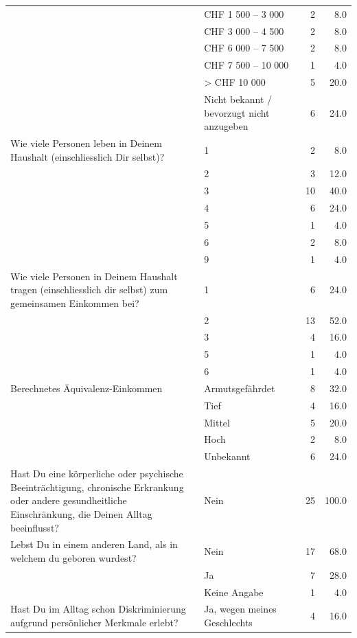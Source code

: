 \begin{appendices}
\begin{longtable}{p{5.5cm}p{5.5cm}rr}
     & CHF 1 500 – 3 000 & 2 & 8.0 \\*
     & CHF 3 000 – 4 500 & 2 & 8.0 \\*
     & CHF 6 000 – 7 500 & 2 & 8.0 \\*
     & CHF 7 500 – 10 000 & 1 & 4.0 \\*
     & > CHF 10 000 & 5 & 20.0 \\*
     & Nicht bekannt / bevorzugt nicht anzugeben & 6 & 24.0 \\
    \midrule
    \addlinespace
    Wie viele Personen leben in Deinem Haushalt (einschliesslich Dir selbst)? & 1 & 2 & 8.0 \\*
     & 2 & 3 & 12.0 \\*
     & 3 & 10 & 40.0 \\*
     & 4 & 6 & 24.0 \\*
     & 5 & 1 & 4.0 \\*
     & 6 & 2 & 8.0 \\*
     & 9 & 1 & 4.0 \\
    \midrule
    \addlinespace
    Wie viele Personen in Deinem Haushalt tragen (einschliesslich dir selbst) zum gemeinsamen Einkommen bei? & 1 & 6 & 24.0 \\*
     & 2 & 13 & 52.0 \\*
     & 3 & 4 & 16.0 \\*
     & 5 & 1 & 4.0 \\*
     & 6 & 1 & 4.0 \\
     \midrule
    \addlinespace
    Berechnetes Äquivalenz-Einkommen \parencite[nach][]{bundesamtfuerstatistikVerteilungVerfuegbarenAequivalenzeinkommens2025} & Armutsgefährdet & 8 & 32.0 \\*
     & Tief & 4 & 16.0 \\*
     & Mittel & 5 & 20.0 \\*
     & Hoch & 2 & 8.0 \\*
     & Unbekannt & 6 & 24.0 \\
     \midrule
    \addlinespace
    Hast Du eine körperliche oder psychische Beeinträchtigung, chronische Erkrankung oder andere gesundheitliche Einschränkung, die Deinen Alltag beeinflusst? & Nein & 25 & 100.0 \\
    \midrule
    \addlinespace
    Lebst Du in einem anderen Land, als in welchem du geboren wurdest? & Nein & 17 & 68.0 \\*
     & Ja & 7 & 28.0 \\*
     & Keine Angabe & 1 & 4.0 \\
     \midrule
    \addlinespace
    Hast Du im Alltag schon Diskriminierung aufgrund persönlicher Merkmale erlebt? & Ja, wegen meines Geschlechts & 4 & 16.0 \\*

\end{longtable}
\end{appendices}
